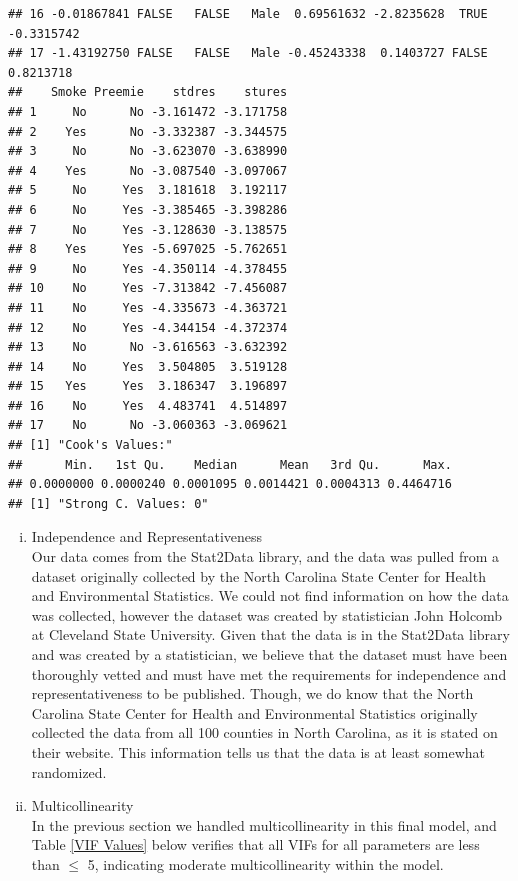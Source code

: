 \documentclass{article}\usepackage[]{graphicx}\usepackage[]{xcolor}
\makeatletter
\newenvironment{kframe}{%
 \def\at@end@of@kframe{}%
 \ifinner\ifhmode%
  \def\at@end@of@kframe{\end{minipage}}%
  \begin{minipage}{\columnwidth}%
 \fi\fi%
 \def\FrameCommand##1{\hskip\@totalleftmargin \hskip-\fboxsep
 \colorbox{shadecolor}{##1}\hskip-\fboxsep
     \hskip-\linewidth \hskip-\@totalleftmargin \hskip\columnwidth}%
 \MakeFramed {\advance\hsize-\width
   \@totalleftmargin\z@ \linewidth\hsize
   \@setminipage}}%
 {\par\unskip\endMakeFramed%
 \at@end@of@kframe}
\newenvironment{knitrout}{}{} %
\makeatother
\begin{document}
\begin{enumerate}[a.]
\begin{knitrout}
\begin{kframe}
\begin{verbatim}
## 16 -0.01867841 FALSE   FALSE   Male  0.69561632 -2.8235628  TRUE -0.3315742
## 17 -1.43192750 FALSE   FALSE   Male -0.45243338  0.1403727 FALSE  0.8213718
##    Smoke Preemie    stdres    stures
## 1     No      No -3.161472 -3.171758
## 2    Yes      No -3.332387 -3.344575
## 3     No      No -3.623070 -3.638990
## 4    Yes      No -3.087540 -3.097067
## 5     No     Yes  3.181618  3.192117
## 6     No     Yes -3.385465 -3.398286
## 7     No     Yes -3.128630 -3.138575
## 8    Yes     Yes -5.697025 -5.762651
## 9     No     Yes -4.350114 -4.378455
## 10    No     Yes -7.313842 -7.456087
## 11    No     Yes -4.335673 -4.363721
## 12    No     Yes -4.344154 -4.372374
## 13    No      No -3.616563 -3.632392
## 14    No     Yes  3.504805  3.519128
## 15   Yes     Yes  3.186347  3.196897
## 16    No     Yes  4.483741  4.514897
## 17    No      No -3.060363 -3.069621
## [1] "Cook's Values:"
##      Min.   1st Qu.    Median      Mean   3rd Qu.      Max. 
## 0.0000000 0.0000240 0.0001095 0.0014421 0.0004313 0.4464716 
## [1] "Strong C. Values: 0"
\end{verbatim}
\end{kframe}
\end{knitrout}
\begin{enumerate}[i.] %
\item Independence and Representativeness \\

Our data comes from the Stat2Data library, and the data was pulled from a dataset originally collected by the North Carolina State Center for Health and Environmental Statistics. We could not find information on how the data was collected, however the dataset was created by statistician John Holcomb at Cleveland State University. Given that the data is in the Stat2Data library and was created by a statistician, we believe that the dataset must have been thoroughly vetted and must have met the requirements for independence and representativeness to be published. Though, we do know that the North Carolina State Center for Health and Environmental Statistics originally collected the data from all 100 counties in North Carolina, as it is stated on their website. This information tells us that the data is at least somewhat randomized.

\item Multicollinearity \\
In the previous section we handled multicollinearity in this final model, and Table \ref{VIF Values} below verifies that all VIFs for all parameters are less than $\leq$ 5, indicating moderate multicollinearity within the model. 


\end{enumerate}
\end{enumerate}
\end{document}
